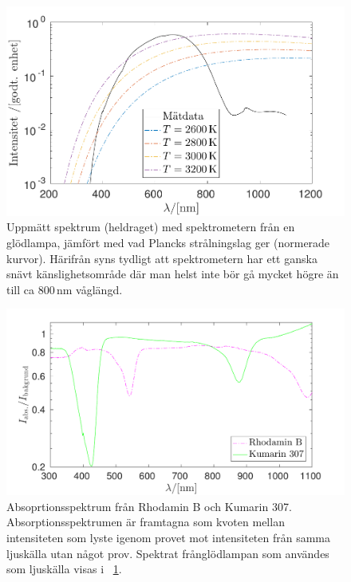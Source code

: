 \documentclass[11pt,a4paper]{article}
\newcommand{\figref}{\figurename~\ref}
\begin{document}
\begin{figure}\centering
\centerline{ %
\includegraphics[width=.9\textwidth]{svartkropp.pdf}
}
\caption{Uppmätt spektrum (heldraget) med spektrometern från en
  glödlampa, jämfört med vad Plancks strålningslag ger (normerade
  kurvor). Härifrån syns tydligt att spektrometern har ett ganska
  snävt känslighetsområde där man helst inte bör gå mycket högre än
  till ca 800\,nm våglängd.}
\label{fig:svartkropp}
\end{figure}

\begin{figure}\centering
\centerline{ %
\includegraphics[width=1\textwidth]{absorption.pdf}
}
\caption{Absoprtionsspektrum från Rhodamin B och Kumarin
  307. Absorptionsspektrumen är framtagna som kvoten mellan
  intensiteten som lyste igenom provet mot intensiteten från samma
  ljuskälla utan något prov. Spektrat frånglödlampan som användes som
  ljuskälla visas i \figref{fig:svartkropp}. 
}
\label{fig:absorption} 
\end{figure}
\end{document}
